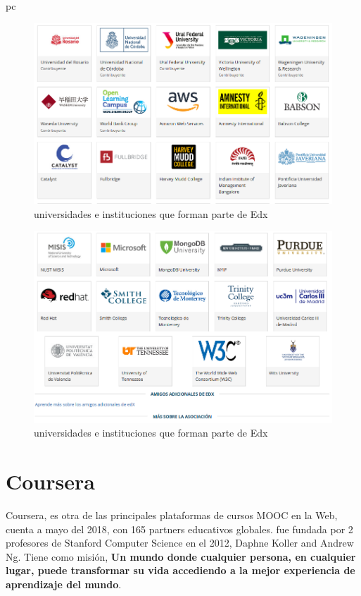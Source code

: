 pc\documentclass[a4paper,12pt,openany]{book}
\begin{document}
\begin{figure}[ht]
  \centering
	\includegraphics[width=12cm]{edx10-7.png}
\caption{universidades e instituciones que forman parte de Edx}
  \label{fig:edx10-7}
\end{figure}

\begin{figure}[ht]
  \centering
	\includegraphics[width=12cm]{edx10-8.png}
\caption{universidades e instituciones que forman parte de Edx}
  \label{fig:edx10-8}
\end{figure}


\clearpage

\section{Coursera}

Coursera, es otra de las principales plataformas de cursos MOOC en la Web, cuenta a mayo del 2018, con 165 partners educativos globales. fue fundada por 2 profesores de Stanford Computer Science en el 2012, Daphne Koller and Andrew Ng. Tiene como misión, \textbf{Un mundo donde cualquier persona, en cualquier lugar, puede transformar su vida accediendo a la mejor experiencia de aprendizaje del mundo}.   
\end{document}
